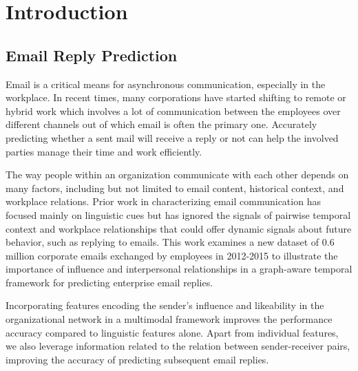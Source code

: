
\chapter{Introduction} %

\label{Chapter1} %



\section{Email Reply Prediction}

Email is a critical means for asynchronous communication, especially in the workplace. In recent times, many corporations have started shifting to remote or hybrid work which involves a lot of communication between the employees over different channels out of which email is often the primary one. Accurately predicting whether a sent mail will receive a reply or not can help the involved parties manage their time and work efficiently.   

The way people within an organization communicate with each other depends on many factors, including but not limited to email content, historical context, and workplace relations. Prior work in characterizing email communication has focused mainly on linguistic cues but has ignored the signals of pairwise temporal context and workplace relationships that could offer dynamic signals about future behavior, such as replying to emails. This work examines a new dataset of 0.6 million corporate emails exchanged by employees in 2012-2015 to illustrate the importance of influence and interpersonal relationships in a graph-aware temporal framework for predicting enterprise email replies. 

Incorporating features encoding the sender's influence and likeability in the organizational network in a multimodal framework improves the performance accuracy compared to linguistic features alone. Apart from individual features, we also leverage information related to the relation between sender-receiver pairs, improving the accuracy of predicting subsequent email replies.


